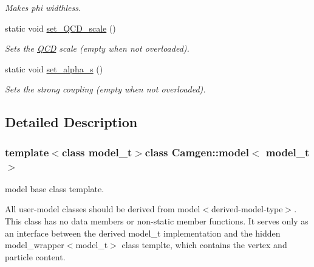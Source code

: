 \begin{DoxyCompactItemize}
\begin{DoxyCompactList}\small\item\em Makes phi widthless. \end{DoxyCompactList}\item 
\hypertarget{a00370_a19058cc8486cf061c09aca2e9a3b2a32}{static void \hyperlink{a00370_a19058cc8486cf061c09aca2e9a3b2a32}{set\-\_\-\-Q\-C\-D\-\_\-scale} ()}\label{a00370_a19058cc8486cf061c09aca2e9a3b2a32}

\begin{DoxyCompactList}\small\item\em Sets the \hyperlink{a00449}{Q\-C\-D} scale (empty when not overloaded). \end{DoxyCompactList}\item 
\hypertarget{a00370_ab7feace0bc1e763dfe540a84cd629b34}{static void \hyperlink{a00370_ab7feace0bc1e763dfe540a84cd629b34}{set\-\_\-alpha\-\_\-s} ()}\label{a00370_ab7feace0bc1e763dfe540a84cd629b34}

\begin{DoxyCompactList}\small\item\em Sets the strong coupling (empty when not overloaded). \end{DoxyCompactList}\end{DoxyCompactItemize}


\subsection{Detailed Description}
\subsubsection*{template$<$class model\-\_\-t$>$class Camgen\-::model$<$ model\-\_\-t $>$}

model base class template. 

All user-\/model classes should be derived from model$<$derived-\/model-\/type$>$. This class has no data members or non-\/static member functions. It serves only as an interface between the derived model\-\_\-t implementation and the hidden model\-\_\-wrapper$<$model\-\_\-t$>$ class templte, which contains the vertex and particle content. 

